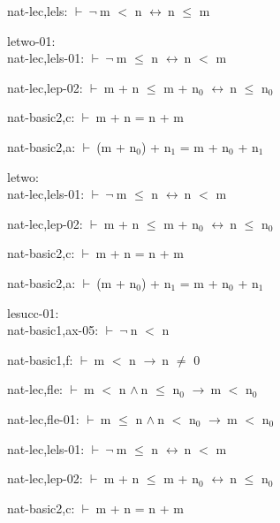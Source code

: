 \documentclass[a4paper]{article}
\newcommand{\Fol}{\mbox{$\vdash\ $}}
\newcommand{\Not}{\mbox{$\neg\ $}}
\newcommand{\And}{\mbox{$\wedge\ $}}
\newcommand{\Imp}{\mbox{$\rightarrow\ $}}
\newcommand{\Equiv}{\mbox{$\leftrightarrow\ $}}
\begin{document}
nat-lec,lels: 
 \Fol \Not m $<$ n \Equiv n $\le$ m



\bigskip

letwo-01:\\ nat-lec,lels-01: 
 \Fol \Not m $\le$ n \Equiv n $<$ m



nat-lec,lep-02: 
 \Fol m + n $\le$ m + $\mbox{n}_{0}$ \Equiv n $\le$ $\mbox{n}_{0}$



nat-basic2,c: 
 \Fol m + n = n + m



nat-basic2,a: 
 \Fol (m + $\mbox{n}_{0}$) + $\mbox{n}_{1}$ = m + $\mbox{n}_{0}$ + $\mbox{n}_{1}$



\bigskip

letwo:\\ nat-lec,lels-01: 
 \Fol \Not m $\le$ n \Equiv n $<$ m



nat-lec,lep-02: 
 \Fol m + n $\le$ m + $\mbox{n}_{0}$ \Equiv n $\le$ $\mbox{n}_{0}$



nat-basic2,c: 
 \Fol m + n = n + m



nat-basic2,a: 
 \Fol (m + $\mbox{n}_{0}$) + $\mbox{n}_{1}$ = m + $\mbox{n}_{0}$ + $\mbox{n}_{1}$



\bigskip

lesucc-01:\\ nat-basic1,ax-05: 
 \Fol \Not n $<$ n



nat-basic1,f: 
 \Fol m $<$ n \Imp n $\neq$ 0



nat-lec,fle: 
 \Fol m $<$ n \And n $\le$ $\mbox{n}_{0}$ \Imp m $<$ $\mbox{n}_{0}$



nat-lec,fle-01: 
 \Fol m $\le$ n \And n $<$ $\mbox{n}_{0}$ \Imp m $<$ $\mbox{n}_{0}$



nat-lec,lels-01: 
 \Fol \Not m $\le$ n \Equiv n $<$ m



nat-lec,lep-02: 
 \Fol m + n $\le$ m + $\mbox{n}_{0}$ \Equiv n $\le$ $\mbox{n}_{0}$



nat-basic2,c: 
 \Fol m + n = n + m
\end{document}
